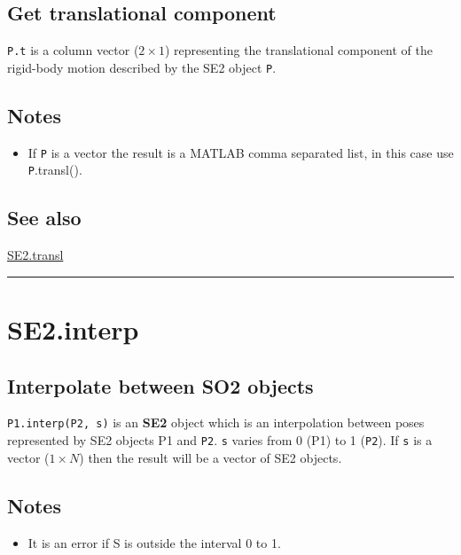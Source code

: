 \subsection*{Get translational component}


\texttt{P.t} is a column vector ($2 \times 1$) representing the translational component of
the rigid-body motion described by the SE2 object \texttt{P}.


\subsection*{Notes}
\begin{itemize}
  \item If \texttt{P} is a vector the result is a MATLAB comma separated list, in this    case use \texttt{P}.transl().
\end{itemize}

\subsection*{See also}


\hyperlink{SE2.transl}{\color{blue} SE2.transl}

\vspace{1.5ex}\hrule

\hypertarget{SE2.interp}{\section*{SE2.interp}}
\subsection*{Interpolate between SO2 objects}


\texttt{P1.interp(P2, s)} is an \textbf{\color{red} SE2} object which is an interpolation
between poses represented by SE2 objects P1 and \texttt{P2}.  \texttt{s} varies from 0
(P1) to 1 (\texttt{P2}). If \texttt{s} is a vector ($1 \times N$) then the result will be a vector
of SE2 objects.


\subsection*{Notes}
\begin{itemize}
  \item It is an error if S is outside the interval 0 to 1.
\end{itemize}

